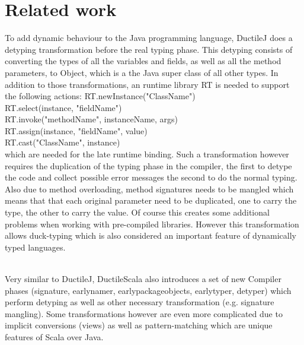 \section{Related work}


To add dynamic behaviour to the Java programming language, DuctileJ does a detyping transformation before the real typing phase. This detyping consists of converting the types of all the variables and fields, as well as all the method parameters, to {\ttfamily Object}, which is a the Java super class of all other types. In addition to those transformations, an runtime library {\ttfamily RT} is needed to support the following actions:
{\ttfamily
RT.newInstance("ClassName")\\
RT.select(instance, "fieldName")\\
RT.invoke("methodName", instanceName, args)\\
RT.assign(instance, "fieldName", value)\\
RT.cast("ClassName", instance)\\	
}
which are needed for the late runtime binding.
Such a transformation however requires the duplication of the typing phase in the compiler, the first to detype the code and collect possible error messages the second to do the normal typing. Also due to method overloading, method signatures needs to be mangled which means that that each original parameter need to be duplicated, one to carry the type, the other to carry the value. Of course this creates some additional problems when working with pre-compiled libraries. However this transformation allows duck-typing which is also considered an important feature of dynamically typed languages.
\\
\\

Very similar to DuctileJ, DuctileScala also introduces a set of new Compiler phases ({\ttfamily signature, earlynamer, earlypackageobjects, earlytyper, detyper}) which perform detyping as well as other necessary transformation (e.g. signature mangling). Some transformations however are even more complicated due to implicit conversions (views) as well as pattern-matching which are unique features of Scala over Java.
\\
\\

